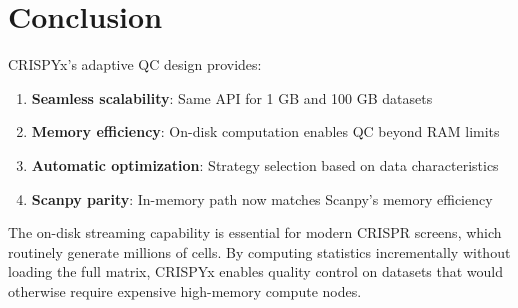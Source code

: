 \documentclass{article}
\begin{document}
\section{Conclusion}

CRISPYx's adaptive QC design provides:
\begin{enumerate}
    \item \textbf{Seamless scalability}: Same API for 1 GB and 100 GB datasets
    \item \textbf{Memory efficiency}: On-disk computation enables QC beyond RAM limits
    \item \textbf{Automatic optimization}: Strategy selection based on data characteristics
    \item \textbf{Scanpy parity}: In-memory path now matches Scanpy's memory efficiency
\end{enumerate}

The on-disk streaming capability is essential for modern CRISPR screens, which 
routinely generate millions of cells. By computing statistics incrementally without 
loading the full matrix, CRISPYx enables quality control on datasets that would 
otherwise require expensive high-memory compute nodes.
\end{document}
